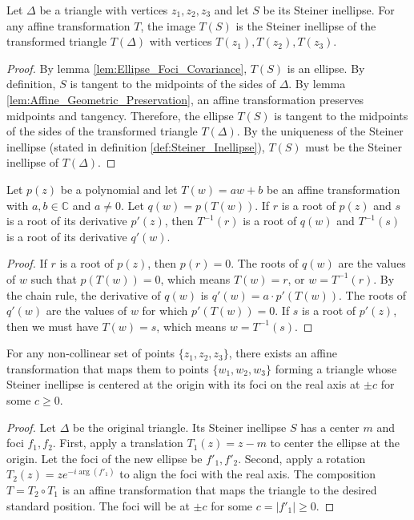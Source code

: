 \begin{lemma}
    \label{lem:Steiner_Inellipse_Covariance}
    Let $\Delta$ be a triangle with vertices $z_1, z_2, z_3$ and let $S$ be its Steiner inellipse. For any affine transformation $T$, the image $T(S)$ is the Steiner inellipse of the transformed triangle $T(\Delta)$ with vertices $T(z_1), T(z_2), T(z_3)$.
\end{lemma}
\begin{proof}
    By lemma \ref{lem:Ellipse_Foci_Covariance}, $T(S)$ is an ellipse. By definition, $S$ is tangent to the midpoints of the sides of $\Delta$. By lemma \ref{lem:Affine_Geometric_Preservation}, an affine transformation preserves midpoints and tangency. Therefore, the ellipse $T(S)$ is tangent to the midpoints of the sides of the transformed triangle $T(\Delta)$. By the uniqueness of the Steiner inellipse (stated in definition \ref{def:Steiner_Inellipse}), $T(S)$ must be the Steiner inellipse of $T(\Delta)$.
\end{proof}

\begin{lemma}
    \label{lem:Root_Derivative_Covariance}
    Let $p(z)$ be a polynomial and let $T(w) = aw+b$ be an affine transformation with $a, b \in \mathbb{C}$ and $a \neq 0$. Let $q(w) = p(T(w))$. If $r$ is a root of $p(z)$ and $s$ is a root of its derivative $p'(z)$, then $T^{-1}(r)$ is a root of $q(w)$ and $T^{-1}(s)$ is a root of its derivative $q'(w)$.
\end{lemma}
\begin{proof}
    If $r$ is a root of $p(z)$, then $p(r)=0$. The roots of $q(w)$ are the values of $w$ such that $p(T(w))=0$, which means $T(w)=r$, or $w=T^{-1}(r)$.
    By the chain rule, the derivative of $q(w)$ is $q'(w) = a \cdot p'(T(w))$. The roots of $q'(w)$ are the values of $w$ for which $p'(T(w))=0$. If $s$ is a root of $p'(z)$, then we must have $T(w)=s$, which means $w=T^{-1}(s)$.
\end{proof}

\begin{lemma}
    \label{lem:Normalization}
    For any non-collinear set of points $\{z_1, z_2, z_3\}$, there exists an affine transformation that maps them to points $\{w_1, w_2, w_3\}$ forming a triangle whose Steiner inellipse is centered at the origin with its foci on the real axis at $\pm c$ for some $c \ge 0$.
\end{lemma}
\begin{proof}
    Let $\Delta$ be the original triangle. Its Steiner inellipse $S$ has a center $m$ and foci $f_1, f_2$. First, apply a translation $T_1(z) = z - m$ to center the ellipse at the origin. Let the foci of the new ellipse be $f'_1, f'_2$. Second, apply a rotation $T_2(z) = z e^{-i\arg(f'_1)}$ to align the foci with the real axis. The composition $T = T_2 \circ T_1$ is an affine transformation that maps the triangle to the desired standard position. The foci will be at $\pm c$ for some $c = |f'_1| \ge 0$.
\end{proof}

